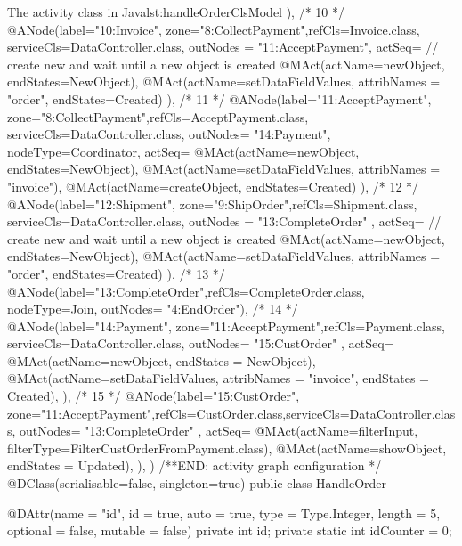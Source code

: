 \begin{lstcodeplainssm}{The activity class  in Java}{lst:handleOrderClsModel}
{{	}),
	/* 10 */    
	@ANode(label="10:Invoice", zone="8:CollectPayment",refCls=Invoice.class, serviceCls=DataController.class, 
	outNodes = {"11:AcceptPayment"},
	actSeq={
		// create new and wait until a new object is created
		@MAct(actName=newObject, endStates={NewObject}),
		@MAct(actName=setDataFieldValues, attribNames = {"order"}, endStates={Created})
	}),
	/* 11 */    
	@ANode(label="11:AcceptPayment", zone="8:CollectPayment",refCls=AcceptPayment.class, serviceCls=DataController.class,
	outNodes= {"14:Payment"},
	nodeType=Coordinator,      
	actSeq={
		@MAct(actName=newObject, endStates={NewObject}),
		@MAct(actName=setDataFieldValues, attribNames = {"invoice"}),
		@MAct(actName=createObject, endStates={Created})
	}),
	/* 12 */    
	@ANode(label="12:Shipment", zone="9:ShipOrder",refCls=Shipment.class, serviceCls=DataController.class,
	outNodes = { "13:CompleteOrder" },
	actSeq={
		// create new and wait until a new object is created
		@MAct(actName=newObject, endStates={NewObject}),
		@MAct(actName=setDataFieldValues, attribNames = {"order"}, endStates={Created})
	}),
	/* 13 */    
	@ANode(label="13:CompleteOrder",refCls=CompleteOrder.class, nodeType=Join, 
	outNodes= {"4:EndOrder"}),
	/* 14 */    
	@ANode(label="14:Payment", zone="11:AcceptPayment",refCls=Payment.class, serviceCls=DataController.class, 
	outNodes= { "15:CustOrder" },
	actSeq={
		@MAct(actName=newObject, endStates = {NewObject}),
		@MAct(actName=setDataFieldValues, attribNames = {"invoice"}, endStates = {Created}),
	}),
	/* 15 */    
	@ANode(label="15:CustOrder", zone="11:AcceptPayment",refCls=CustOrder.class,serviceCls=DataController.class,
	outNodes= { "13:CompleteOrder" },
	actSeq={
		@MAct(actName=filterInput, filterType=FilterCustOrderFromPayment.class),
		@MAct(actName=showObject, endStates = {Updated}),
	}),
})
/**END: activity graph configuration */
@DClass(serialisable=false, singleton=true)
public class HandleOrder {
	@DAttr(name = "id", id = true, auto = true, type = Type.Integer, length = 5, 
	optional = false, mutable = false)
	private int id;
	private static int idCounter = 0;
	
}
\end{lstcodeplainssm}
